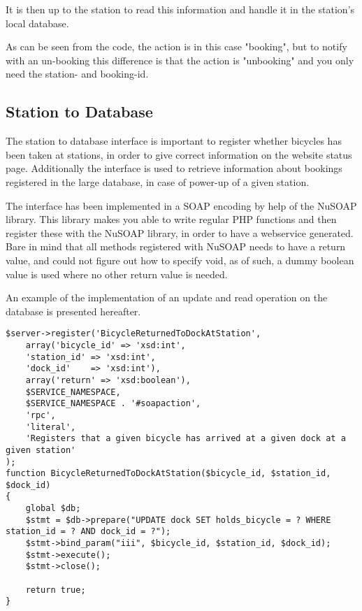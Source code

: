 It is then up to the station to read this information and handle it in the station's local database.

As can be seen from the code, the action is in this case "booking", but to notify with an un-booking this difference is that the action is "unbooking" and you only need the station- and booking-id.

\subsection{Station to Database}
The station to database interface is important to register whether bicycles has been taken at stations, in order to give correct information on the website status page.
Additionally the interface is used to retrieve information about bookings registered in the large database, in case of power-up of a given station.

The interface has been implemented in a SOAP encoding by help of the NuSOAP library.
This library makes you able to write regular PHP functions and then register these with the NuSOAP library, in order to have a webservice generated.
Bare in mind that all methods registered with NuSOAP needs to have a return value, and could not figure out how to specify void, as of such, a dummy boolean value is used where no other return value is needed.

An example of the implementation of an update and read operation on the database is presented hereafter.

\begin{minipage}{\textwidth}
\begin{lstlisting}[caption = {Method for registering a bicycle as been returned to a dock at a given station.}, label = {lst:bicycledockstationreturned}]
$server->register('BicycleReturnedToDockAtStation',
	array('bicycle_id' => 'xsd:int',
	'station_id' => 'xsd:int',
	'dock_id'    => 'xsd:int'),
	array('return' => 'xsd:boolean'),
	$SERVICE_NAMESPACE,
	$SERVICE_NAMESPACE . '#soapaction',
	'rpc',
	'literal',
	'Registers that a given bicycle has arrived at a given dock at a given station'
);
function BicycleReturnedToDockAtStation($bicycle_id, $station_id, $dock_id)
{
	global $db;
	$stmt = $db->prepare("UPDATE dock SET holds_bicycle = ? WHERE station_id = ? AND dock_id = ?");
	$stmt->bind_param("iii", $bicycle_id, $station_id, $dock_id);
	$stmt->execute();
	$stmt->close();
	
	return true;
}
\end{lstlisting}
\end{minipage}

